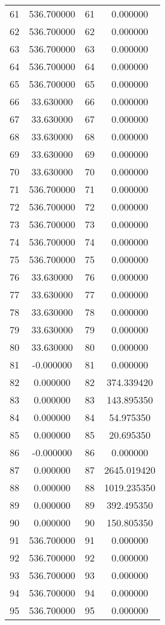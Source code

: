 \documentclass[12pt]{article}
\begin{document}
\begin{longtable}{@{}cccc@{}}
61 & 536.700000 & 61 & 0.000000 \\
62 & 536.700000 & 62 & 0.000000 \\
63 & 536.700000 & 63 & 0.000000 \\
64 & 536.700000 & 64 & 0.000000 \\
65 & 536.700000 & 65 & 0.000000 \\
66 & 33.630000 & 66 & 0.000000 \\
67 & 33.630000 & 67 & 0.000000 \\
68 & 33.630000 & 68 & 0.000000 \\
69 & 33.630000 & 69 & 0.000000 \\
70 & 33.630000 & 70 & 0.000000 \\
71 & 536.700000 & 71 & 0.000000 \\
72 & 536.700000 & 72 & 0.000000 \\
73 & 536.700000 & 73 & 0.000000 \\
74 & 536.700000 & 74 & 0.000000 \\
75 & 536.700000 & 75 & 0.000000 \\
76 & 33.630000 & 76 & 0.000000 \\
77 & 33.630000 & 77 & 0.000000 \\
78 & 33.630000 & 78 & 0.000000 \\
79 & 33.630000 & 79 & 0.000000 \\
80 & 33.630000 & 80 & 0.000000 \\
81 & -0.000000 & 81 & 0.000000 \\
82 & 0.000000 & 82 & 374.339420 \\
83 & 0.000000 & 83 & 143.895350 \\
84 & 0.000000 & 84 & 54.975350 \\
85 & 0.000000 & 85 & 20.695350 \\
86 & -0.000000 & 86 & 0.000000 \\
87 & 0.000000 & 87 & 2645.019420 \\
88 & 0.000000 & 88 & 1019.235350 \\
89 & 0.000000 & 89 & 392.495350 \\
90 & 0.000000 & 90 & 150.805350 \\
91 & 536.700000 & 91 & 0.000000 \\
92 & 536.700000 & 92 & 0.000000 \\
93 & 536.700000 & 93 & 0.000000 \\
94 & 536.700000 & 94 & 0.000000 \\
95 & 536.700000 & 95 & 0.000000 \\

\end{longtable}
\end{document}
